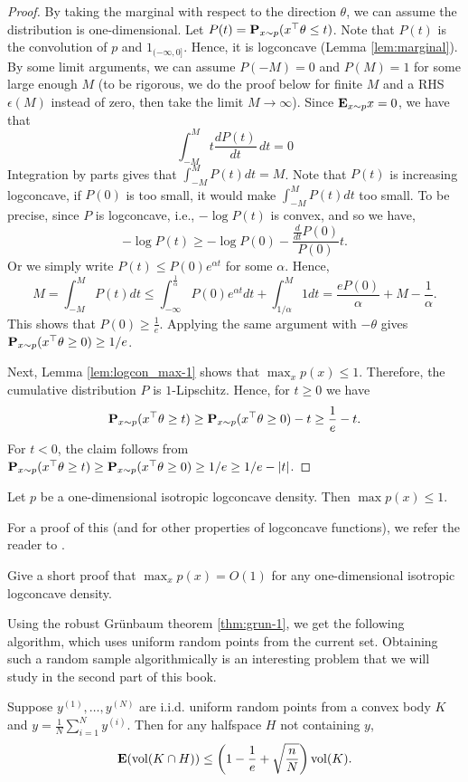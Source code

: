 \begin{proof}
By taking the marginal with respect to the direction $\theta$, we
can assume the distribution is one-dimensional. Let $P(t)=\P_{x\sim p}(x^{\top}\theta\le t)$.
Note that $P(t)$ is the convolution of $p$ and $1_{(-\infty,0]}$.
Hence, it is logconcave (Lemma \ref{lem:marginal}). By some limit
arguments, we can assume $P(-M)=0$ and $P(M)=1$ for some large enough
$M$ (to be rigorous, we do the proof below for finite $M$ and a
RHS $\epsilon(M)$ instead of zero, then take the limit $M\rightarrow\infty$).
Since $\E_{x\sim p}x=0$, we have that
\[
\int^{M}_{-M}t\frac{dP(t)}{dt}\,dt=0
\]
Integration by parts gives that $\int^{M}_{-M}P(t)dt=M$. Note that
$P(t)$ is increasing logconcave, if $P(0)$ is too small, it would
make $\int^{M}_{-M}P(t)dt$ too small. To be precise, since $P$ is
logconcave, i.e., $-\log P(t)$ is convex, and so we have,
\[
-\log P(t)\geq-\log P(0)-\frac{\frac{d}{dt}P(0)}{P(0)}t.
\]
Or we simply write $P(t)\leq P(0)e^{\alpha t}$ for some $\alpha$.
Hence,
\[
M=\int^{M}_{-M}P(t)dt\leq\int^{\frac{1}{\alpha}}_{-\infty}P(0)e^{\alpha t}dt+\int^{M}_{1/\alpha}1dt=\frac{eP(0)}{\alpha}+M-\frac{1}{\alpha}.
\]
This shows that $P(0)\geq\frac{1}{e}$. Applying the same argument
with $-\theta$ gives $\P_{x\sim p}(x^{\top}\theta\ge0)\ge1/e$.

Next, Lemma \ref{lem:logcon_max-1} shows that $\max_{x}p(x)\le1$.
Therefore, the cumulative distribution $P$ is $1$-Lipschitz. Hence,
for $t\ge0$ we have
\[
\P_{x\sim p}(x^{\top}\theta\geq t)\ge\P_{x\sim p}(x^{\top}\theta\geq0)-t\geq\frac{1}{e}-t.
\]
For $t<0$, the claim follows from $\P_{x\sim p}(x^{\top}\theta\ge t)\ge\P_{x\sim p}(x^{\top}\theta\ge0)\ge1/e\ge1/e-\left|t\right|$.
\end{proof}
\begin{lem}
\label{lem:logcon_max-1}Let $p$ be a one-dimensional isotropic logconcave
density. Then $\max p(x)\le1$.
\end{lem}

For a proof of this (and for other properties of logconcave functions),
we refer the reader to \cite{lovasz2007geometry}.
\begin{xca}
Give a short proof that $\max_{x}p(x)=O(1)$ for any one-dimensional
isotropic logconcave density.
\end{xca}

Using the robust Gr\"unbaum theorem \ref{thm:grun-1}, we get the
following algorithm, which uses uniform random points from the current
set. Obtaining such a random sample algorithmically is an interesting
problem that we will study in the second part of this book.
\begin{lem}
Suppose $y^{(1)},\ldots,y^{(N)}$ are i.i.d. uniform random points
from a convex body $K$ and $y=\frac{1}{N}\sum^{N}_{i=1}y^{(i)}$.
Then for any halfspace $H$ not containing $y$, 
\[
\E(\vol(K\cap H))\le\left(1-\frac{1}{e}+\sqrt{\frac{n}{N}}\right)\vol(K).
\]
\end{lem}

